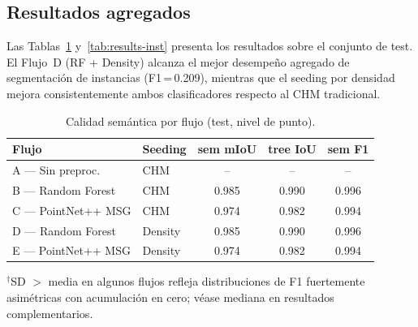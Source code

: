 \documentclass{cys}
\begin{document}
\subsection{Resultados agregados}

Las Tablas~\ref{tab:results-sem} y~\ref{tab:results-inst} presenta los resultados sobre el conjunto de test. El Flujo~D (RF + Density) alcanza el mejor desempeño agregado de segmentación de instancias (F1\,=\,0.209), mientras que el seeding por densidad mejora consistentemente ambos clasificadores respecto al CHM tradicional.

\begin{table}[H]
\centering
\caption{Calidad sem\'antica por flujo (test, nivel de punto).}\label{tab:results-sem}
\begin{tabular}{llccc}
\toprule
Flujo & Seeding & sem mIoU & tree IoU & sem F1 \\
\midrule
A --- Sin preproc.       & CHM     & --    & --    & --    \\
B --- Random Forest      & CHM     & 0.985 & 0.990 & 0.996 \\
C --- PointNet++ MSG     & CHM     & 0.974 & 0.982 & 0.994 \\
D --- Random Forest      & Density & 0.985 & 0.990 & 0.996 \\
E --- PointNet++ MSG     & Density & 0.974 & 0.982 & 0.994 \\
\bottomrule
\end{tabular}
\end{table}

\begin{table}[H]
\centering
\caption{Resultados de segmentaci\'on de instancias (test, IoU~3D~$\geq 0.5$, media $\pm$ SD sobre $n=11$~plots).}\label{tab:results-inst}
\vspace{1mm}
{\footnotesize $^\dagger$SD $>$ media en algunos flujos refleja distribuciones de F1 fuertemente asim\'etricas con acumulaci\'on en cero; v\'ease mediana en resultados complementarios.}
\end{table}
\end{document}
